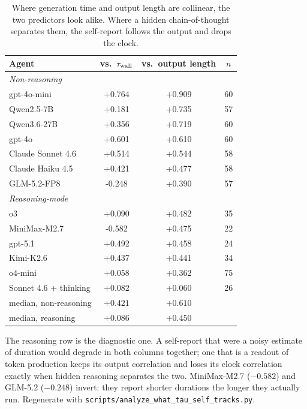 \begin{table}[h]
\centering\small
\setlength{\tabcolsep}{5pt}
\caption{Where generation time and output length are collinear, the two
predictors look alike. Where a hidden chain-of-thought separates them, the
self-report follows the output and drops the clock.}
\label{tab:tauself-tracks}
\begin{tabular}{lccc}
\toprule
Agent & vs.\ $\tau_{\mathrm{wall}}$ & vs.\ output length & $n$ \\
\midrule
\multicolumn{4}{l}{\textit{Non-reasoning}} \\
gpt-4o-mini & +0.764 & +0.909 & 60 \\
Qwen2.5-7B & +0.181 & +0.735 & 57 \\
Qwen3.6-27B & +0.356 & +0.719 & 60 \\
gpt-4o & +0.601 & +0.610 & 60 \\
Claude Sonnet 4.6 & +0.514 & +0.544 & 58 \\
Claude Haiku 4.5 & +0.421 & +0.477 & 58 \\
GLM-5.2-FP8 & -0.248 & +0.390 & 57 \\
\midrule
\multicolumn{4}{l}{\textit{Reasoning-mode}} \\
o3 & +0.090 & +0.482 & 35 \\
MiniMax-M2.7 & -0.582 & +0.475 & 22 \\
gpt-5.1 & +0.492 & +0.458 & 24 \\
Kimi-K2.6 & +0.437 & +0.441 & 34 \\
o4-mini & +0.058 & +0.362 & 75 \\
Sonnet 4.6 + thinking & +0.082 & +0.060 & 26 \\
\midrule
median, non-reasoning & $+0.421$ & $+0.610$ & \\
median, reasoning     & $+0.086$ & $+0.450$ & \\
\bottomrule
\end{tabular}
\end{table}

The reasoning row is the diagnostic one. A self-report that were a noisy
estimate of duration would degrade in both columns together; one that is a
readout of token production keeps its output correlation and loses its clock
correlation exactly when hidden reasoning separates the two. MiniMax-M2.7
($-0.582$) and GLM-5.2 ($-0.248$) invert: they report shorter durations the
longer they actually run. Regenerate with
\texttt{scripts/analyze\_what\_tau\_self\_tracks.py}.

